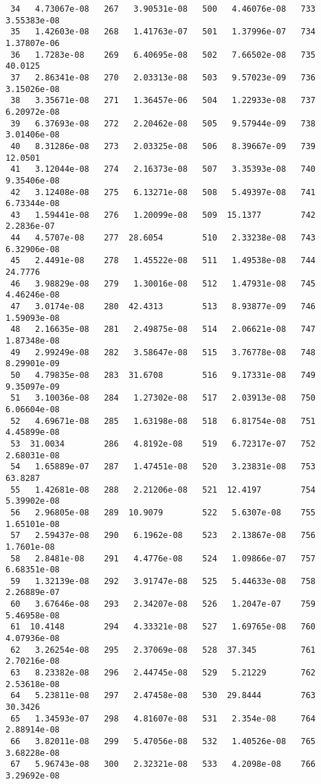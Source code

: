 \documentclass{article}
\begin{document}
\begin{verbatim}
 34   4.73067e-08   267   3.90531e-08   500   4.46076e-08   733   3.55383e-08
 35   1.42603e-08   268   1.41763e-07   501   1.37996e-07   734   1.37807e-06
 36   1.7283e-08    269   6.40695e-08   502   7.66502e-08   735  40.0125
 37   2.86341e-08   270   2.03313e-08   503   9.57023e-09   736   3.15026e-08
 38   3.35671e-08   271   1.36457e-06   504   1.22933e-08   737   6.20972e-08
 39   6.37693e-08   272   2.20462e-08   505   9.57944e-09   738   3.01406e-08
 40   8.31286e-08   273   2.03325e-08   506   8.39667e-09   739  12.0501
 41   3.12044e-08   274   2.16373e-08   507   3.35393e-08   740   9.35406e-08
 42   3.12408e-08   275   6.13271e-08   508   5.49397e-08   741   6.73344e-08
 43   1.59441e-08   276   1.20099e-08   509  15.1377        742   2.2836e-07
 44   4.5707e-08    277  28.6054        510   2.33238e-08   743   6.32906e-08
 45   2.4491e-08    278   1.45522e-08   511   1.49538e-08   744  24.7776
 46   3.98829e-08   279   1.30016e-08   512   1.47931e-08   745   4.46246e-08
 47   3.0174e-08    280  42.4313        513   8.93877e-09   746   1.59093e-08
 48   2.16635e-08   281   2.49875e-08   514   2.06621e-08   747   1.87348e-08
 49   2.99249e-08   282   3.58647e-08   515   3.76778e-08   748   8.29901e-09
 50   4.79835e-08   283  31.6708        516   9.17331e-08   749   9.35097e-09
 51   3.10036e-08   284   1.27302e-08   517   2.03913e-08   750   6.06604e-08
 52   4.69671e-08   285   1.63198e-08   518   6.81754e-08   751   4.45899e-08
 53  31.0034        286   4.8192e-08    519   6.72317e-07   752   2.68031e-08
 54   1.65889e-07   287   1.47451e-08   520   3.23831e-08   753  63.8287
 55   1.42681e-08   288   2.21206e-08   521  12.4197        754   5.39902e-08
 56   2.96805e-08   289  10.9079        522   5.6307e-08    755   1.65101e-08
 57   2.59437e-08   290   6.1962e-08    523   2.13867e-08   756   1.7601e-08
 58   2.8481e-08    291   4.4776e-08    524   1.09866e-07   757   6.68351e-08
 59   1.32139e-08   292   3.91747e-08   525   5.44633e-08   758   2.26889e-07
 60   3.67646e-08   293   2.34207e-08   526   1.2047e-07    759   5.46958e-08
 61  10.4148        294   4.33321e-08   527   1.69765e-08   760   4.07936e-08
 62   3.26254e-08   295   2.37069e-08   528  37.345         761   2.70216e-08
 63   8.23382e-08   296   2.44745e-08   529   5.21229       762   2.53618e-08
 64   5.23811e-08   297   2.47458e-08   530  29.8444        763  30.3426
 65   1.34593e-07   298   4.81607e-08   531   2.354e-08     764   2.88914e-08
 66   3.82011e-08   299   5.47056e-08   532   1.40526e-08   765   3.68228e-08
 67   5.96743e-08   300   2.32321e-08   533   4.2098e-08    766   3.29692e-08

\end{verbatim}
\end{document}
